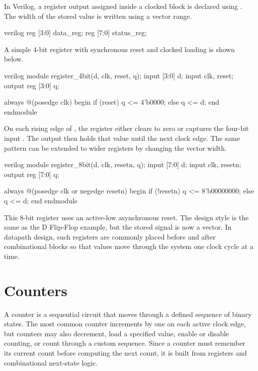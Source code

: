 \noindent In Verilog, a register output assigned inside a clocked  block is
declared using . The width of the stored value is written using a vector range.

\begin{codeblock}{verilog}
reg [3:0] data_reg;
reg [7:0] status_reg;
\end{codeblock}

\noindent A simple 4-bit register with synchronous reset and clocked loading is shown below.

\begin{codeblock}{verilog}
module register_4bit(d, clk, reset, q);
    input [3:0] d;
    input clk, reset;
    output reg [3:0] q;

    always @(posedge clk) begin
        if (reset)
            q <= 4'b0000;
        else
            q <= d;
    end
endmodule
\end{codeblock}

\noindent On each rising edge of , the register either clears to zero or captures
the four-bit input . The output  then holds that value until the next
clock edge. The same pattern can be extended to wider registers by changing the vector width.

\begin{codeblock}{verilog}
module register_8bit(d, clk, resetn, q);
    input [7:0] d;
    input clk, resetn;
    output reg [7:0] q;

    always @(posedge clk or negedge resetn) begin
        if (!resetn)
            q <= 8'b00000000;
        else
            q <= d;
    end
endmodule
\end{codeblock}

\noindent This 8-bit register uses an active-low asynchronous reset. The design style is the same as
the D Flip-Flop example, but the stored signal is now a vector. In datapath design, such registers
are commonly placed before and after combinational blocks so that values move through the system one
clock cycle at a time.

\section{Counters}
A counter is a sequential circuit that moves through a defined sequence of binary states. The most
common counter increments by one on each active clock edge, but counters may also decrement, load a
specified value, enable or disable counting, or count through a custom sequence. Since a counter must
remember its current count before computing the next count, it is built from registers and
combinational next-state logic.\\

